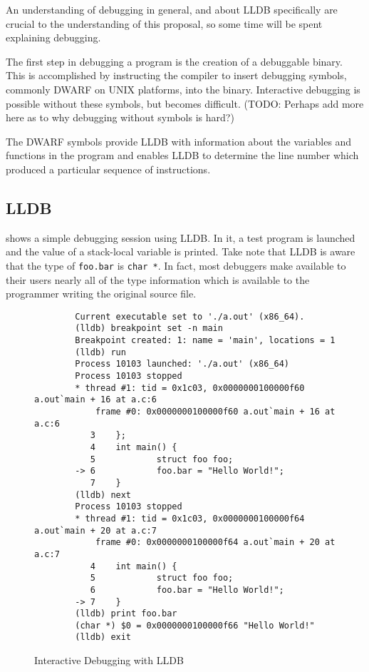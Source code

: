 \documentclass[draft]{article}
\begin{document}
An understanding of debugging in general, and about LLDB specifically are
crucial to the understanding of this proposal, so some time will be spent
explaining debugging.

The first step in debugging a program is the creation of a debuggable binary.
This is accomplished by instructing the compiler to insert debugging symbols,
commonly DWARF on UNIX platforms, into the binary. Interactive debugging is
possible without these symbols, but becomes difficult. (TODO: Perhaps add more
here as to why debugging without symbols is hard?)

The DWARF symbols provide LLDB with information about the variables and
functions in the program and enables LLDB to determine the line number which
produced a particular sequence of instructions.

\subsection{LLDB}
 shows a simple debugging session using LLDB. In it, a test
program is launched and the value of a stack-local variable is printed. Take
note that LLDB is aware that the type of \texttt{foo.bar} is \texttt{char *}. In
fact, most debuggers make available to their users nearly all of the type
information which is available to the programmer writing the original source file.

\begin{figure*}[p]
	\begin{verbatim}
		Current executable set to './a.out' (x86_64).
		(lldb) breakpoint set -n main
		Breakpoint created: 1: name = 'main', locations = 1
		(lldb) run
		Process 10103 launched: './a.out' (x86_64)
		Process 10103 stopped
		* thread #1: tid = 0x1c03, 0x0000000100000f60 a.out`main + 16 at a.c:6
		    frame #0: 0x0000000100000f60 a.out`main + 16 at a.c:6
		   3    };
		   4    int main() {
		   5            struct foo foo;
		-> 6            foo.bar = "Hello World!";
		   7    }
		(lldb) next
		Process 10103 stopped
		* thread #1: tid = 0x1c03, 0x0000000100000f64 a.out`main + 20 at a.c:7
		    frame #0: 0x0000000100000f64 a.out`main + 20 at a.c:7
		   4    int main() {
		   5            struct foo foo;
		   6            foo.bar = "Hello World!";
		-> 7    }
		(lldb) print foo.bar
		(char *) $0 = 0x0000000100000f66 "Hello World!"
		(lldb) exit
	\end{verbatim}
	\caption{Interactive Debugging with LLDB}
	\label{fig:debugging}
\end{figure*}
\end{document}
